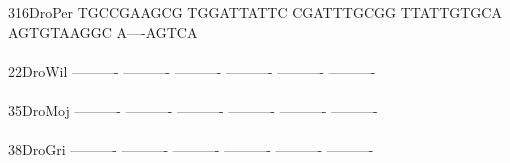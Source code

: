 \documentclass[11pt,twoside,reqno,a4paper]{article}
\begin{document}
{316\hspace*{2\charwidth}DroPer	TGCCGAAGCG	TGGATTATTC	CGATTTGCGG	TTATTGTGCA	AGTGTAAGGC	A----AGTCA	\\
\hspace*{5\charwidth}\hspace*{7\charwidth}\hspace*{1\charwidth}\hspace*{1\charwidth}\hspace*{1\charwidth}\hspace*{1\charwidth}\hspace*{1\charwidth}\hspace*{1\charwidth}\\
22\hspace*{3\charwidth}DroWil	----------	----------	----------	----------	----------	----------	\\
\hspace*{5\charwidth}\hspace*{7\charwidth}\hspace*{1\charwidth}\hspace*{1\charwidth}\hspace*{1\charwidth}\hspace*{1\charwidth}\hspace*{1\charwidth}\hspace*{1\charwidth}\\
35\hspace*{3\charwidth}DroMoj	----------	----------	----------	----------	----------	----------	\\
\hspace*{5\charwidth}\hspace*{7\charwidth}\hspace*{1\charwidth}\hspace*{1\charwidth}\hspace*{1\charwidth}\hspace*{1\charwidth}\hspace*{1\charwidth}\hspace*{1\charwidth}\\
38\hspace*{3\charwidth}DroGri	----------	----------	----------	----------	----------	----------	\\
\hspace*{5\charwidth}\hspace*{7\charwidth}\hspace*{1\charwidth}\hspace*{1\charwidth}\hspace*{1\charwidth}\hspace*{1\charwidth}\hspace*{1\charwidth}\hspace*{1\charwidth}\\
}
\end{document}
